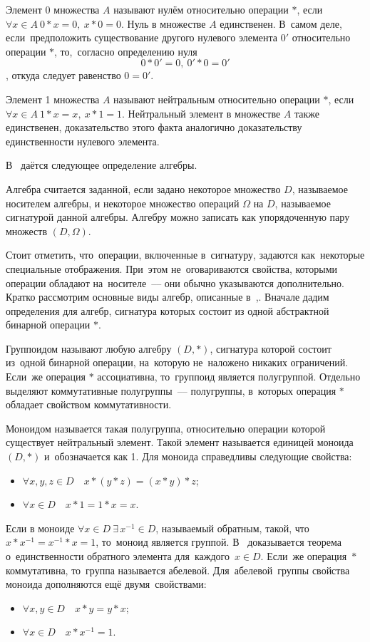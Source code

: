 Элемент $0$ множества $A$ называют нулём относительно операции $*$, если $\forall x\in A\ 0*x=0,\ x*0=0$. Нуль в множестве $A$ единственен. В~самом деле, если~предположить существование другого нулевого элемента ${0}'$ относительно операции $*$, то,~согласно определению нуля
\[
	0*{0}'=0,\ {0}'*0={0}'
\],
откуда следует равенство $0={0}'$.

Элемент 1 множества $A$ называют нейтральным относительно операции $*$, если $\forall x\in A\ 1*x=x,\ x*1=1$.
Нейтральный элемент в множестве $A$ также единственен, доказательство этого факта аналогично доказательству единственности нулевого элемента.

В~\cite{Bauman_DM, Adelson_Velskiy} даётся следующее определение алгебры.
\begin{mydef}
Алгебра считается заданной, если задано некоторое множество $D$, называемое носителем алгебры, и некоторое множество операций $\Omega $ на $D$, называемое сигнатурой данной алгебры. Алгебру можно записать как упорядоченную пару множеств $\left( D,\Omega  \right)$.
\end{mydef}

Стоит отметить, что~операции, включенные в~сигнатуру, задаются как~некоторые специальные отображения. При~этом не~оговариваются свойства, которыми операции обладают на~носителе~--– они обычно указываются дополнительно.
Кратко рассмотрим основные виды алгебр, описанные в~\cite{Bauman_DM, Adelson_Velskiy, Voevodin},. Вначале дадим определения для алгебр, сигнатура которых состоит из одной абстрактной бинарной операции $*$.

Группоидом называют любую алгебру $\left( D,* \right)$, сигнатура которой состоит из~одной бинарной операции, на~которую не~наложено никаких ограничений. Если~же операция $*$ ассоциативна, то~группоид является полугруппой. Отдельно выделяют коммутативные полугруппы~--– полугруппы, в~которых операция $*$ обладает свойством коммутативности.

Моноидом называется такая полугруппа, относительно операции которой существует нейтральный элемент. Такой элемент называется единицей моноида $\left( D,* \right)$ и~обозначается как 1. Для моноида справедливы следующие свойства:
\begin{itemize}
	\item $\forall x,y,z\in D\quad x*\left( y*z \right)=\left( x*y \right)*z$;
	\item $\forall x\in D\quad x*1=1*x=x$.
\end{itemize}

Если в моноиде $\forall x\in D\ \exists \,{{x}^{-1}}\in D$, называемый обратным, такой, что~$x*{{x}^{-1}}={{x}^{-1}}*x=1$, то~моноид является группой. В~\cite{Bauman_DM, Adelson_Velskiy, Voevodin} доказывается теорема о~единственности обратного элемента для~каждого~$x\in D$. Если~же операция~$*$ коммутативна, то~группа называется абелевой. Для~абелевой~группы свойства моноида дополняются ещё двумя~свойствами:
\begin{itemize}
	\item $\forall x,y\in D\quad x*y=y*x$;
	\item $\forall x\in D\quad x*{{x}^{-1}}=1$.
\end{itemize}

